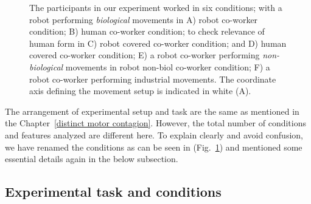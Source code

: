 \begin{figure}[b]
	\caption{The participants in our experiment worked in six conditions; with a robot performing \textit{biological} movements in A) robot co-worker condition; B) human co-worker condition; to check relevance of  human form in C) robot covered co-worker condition; and D) human covered co-worker condition; E) a robot co-worker performing \textit{non-biological} movements in robot non-biol co-worker condition; F) a robot co-worker performing industrial movements. The coordinate axis defining the movement setup is indicated in white (A).}
	\label{fig:setup1}
\end{figure}

The arrangement of experimental setup and task are the same as mentioned in the Chapter~\ref{distinct motor contagion}. However, the total number of conditions and features analyzed are different here. To explain clearly and avoid confusion, we have renamed the conditions as can be seen in (Fig.~\ref{fig:setup1}) and mentioned some essential details again in the below subsection.

\subsection{Experimental task and conditions}

